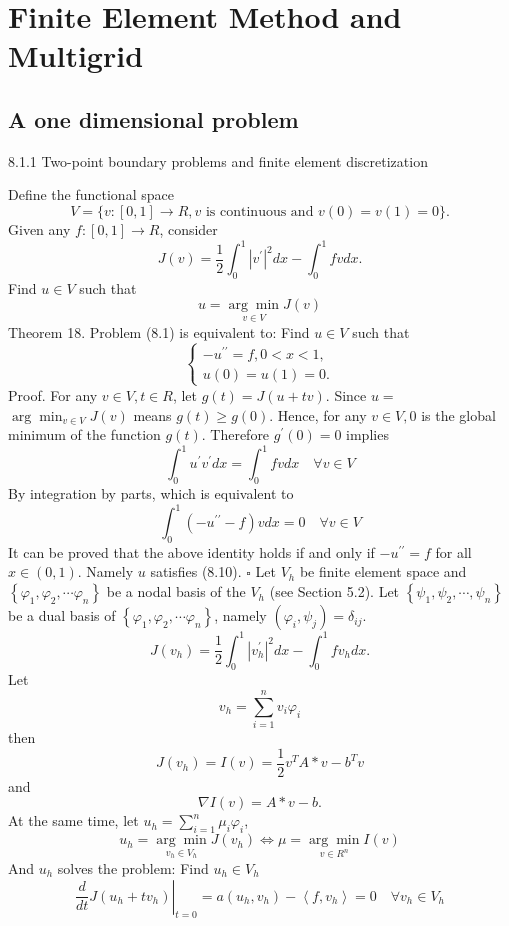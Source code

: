 \documentclass[10pt]{article}
\begin{document}
\section{Finite Element Method and Multigrid}
\subsection{A one dimensional problem}
8.1.1 Two-point boundary problems and finite element discretization

Define the functional space
$$
V=\{v:[0,1] \rightarrow R, v \text { is continuous and } v(0)=v(1)=0\} .
$$
Given any $f:[0,1] \rightarrow R$, consider
$$
J(v)=\frac{1}{2} \int_{0}^{1}\left|v^{\prime}\right|^{2} d x-\int_{0}^{1} f v d x .
$$
Find $u \in V$ such that
$$
u=\underset{v \in V}{\arg \min } J(v)
$$
Theorem 18. Problem (8.1) is equivalent to: Find $u \in V$ such that
$$
\left\{\begin{array}{l}
-u^{\prime \prime}=f, 0<x<1, \\
u(0)=u(1)=0 .
\end{array}\right.
$$
Proof. For any $v \in V, t \in R$, let $g(t)=J(u+t v)$. Since $u=$ $\arg \min _{v \in V} J(v)$ means $g(t) \geq g(0)$. Hence, for any $v \in V, 0$ is the global minimum of the function $g(t)$. Therefore $g^{\prime}(0)=0$ implies
$$
\int_{0}^{1} u^{\prime} v^{\prime} d x=\int_{0}^{1} f v d x \quad \forall v \in V
$$
By integration by parts, which is equivalent to
$$
\int_{0}^{1}\left(-u^{\prime \prime}-f\right) v d x=0 \quad \forall v \in V
$$
It can be proved that the above identity holds if and only if $-u^{\prime \prime}=f$ for all $x \in(0,1)$. Namely $u$ satisfies (8.10). $\square$ Let $V_{h}$ be finite element space and $\left\{\varphi_{1}, \varphi_{2}, \cdots \varphi_{n}\right\}$ be a nodal basis of the $V_{h}$ (see Section 5.2). Let $\left\{\psi_{1}, \psi_{2}, \cdots, \psi_{n}\right\}$ be a dual basis of $\left\{\varphi_{1}, \varphi_{2}, \cdots \varphi_{n}\right\}$, namely $\left(\varphi_{i}, \psi_{j}\right)=\delta_{i j}$.
$$
J\left(v_{h}\right)=\frac{1}{2} \int_{0}^{1}\left|v_{h}^{\prime}\right|^{2} d x-\int_{0}^{1} f v_{h} d x .
$$
Let
$$
v_{h}=\sum_{i=1}^{n} v_{i} \varphi_{i}
$$
then
$$
J\left(v_{h}\right)=I(v)=\frac{1}{2} v^{T} A * v-b^{T} v
$$
and
$$
\nabla I(v)=A * v-b .
$$
At the same time, let $u_{h}=\sum_{i=1}^{n} \mu_{i} \varphi_{i}$,
$$
u_{h}=\underset{v_{h} \in V_{h}}{\arg \min } J\left(v_{h}\right) \Leftrightarrow \mu=\underset{v \in R^{n}}{\arg \min } I(v)
$$
And $u_{h}$ solves the problem: Find $u_{h} \in V_{h}$
$$
\left.\frac{d}{d t} J\left(u_{h}+t v_{h}\right)\right|_{t=0}=a\left(u_{h}, v_{h}\right)-\left\langle f, v_{h}\right\rangle=0 \quad \forall v_{h} \in V_{h}
$$
\end{document}
